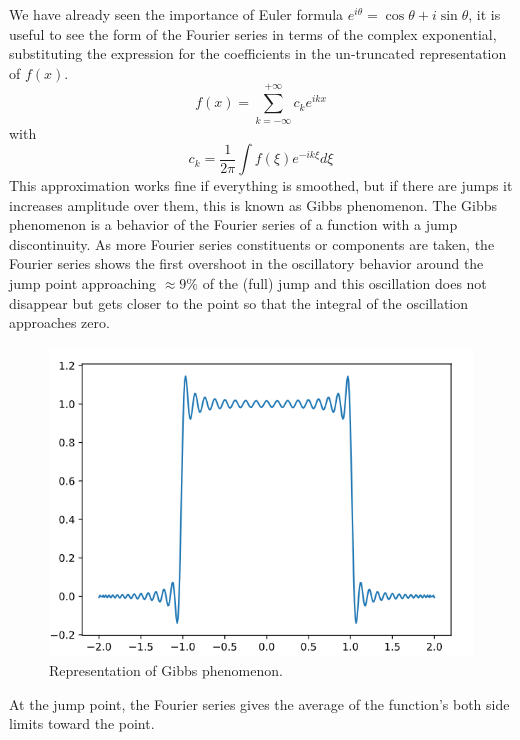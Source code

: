 We have already seen the importance of Euler formula $e^{i\theta}=\cos\theta+i\sin\theta$, it is useful to see the form of the Fourier series in terms of the complex exponential, substituting the expression for the coefficients in the un-truncated representation of $f(x)$.
\begin{equation}\label{eq.complex Fourier}
    f(x)=\displaystyle\sum_{k=-\infty}^{+\infty}c_ke^{ikx}
\end{equation}
with 
\begin{equation}
    c_k=\frac{1}{2\pi}\int f(\xi)e^{-ik\xi}d\xi
\end{equation}
This approximation works fine if everything is smoothed, but if there are jumps it increases amplitude over them, this is known as Gibbs phenomenon. 
The Gibbs phenomenon is a behavior of the Fourier series of a function with a jump discontinuity. As more Fourier series constituents or components are taken, the Fourier series shows the first overshoot in the oscillatory behavior around the jump point approaching  $\approx9\%$ of the (full) jump and this oscillation does not disappear but gets closer to the point so that the integral of the oscillation approaches zero.
\begin{figure}
    \centering
    \includegraphics[width=0.5\linewidth]{uploads/Screenshot 2024-11-14 170405.png}
    \caption{Representation of Gibbs phenomenon.}
    \label{fig:Gibbs}
\end{figure}
At the jump point, the Fourier series gives the average of the function's both side limits toward the point. 

